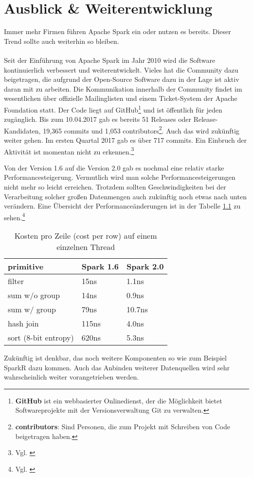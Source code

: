\newpage
\chapter{Ausblick \& Weiterentwicklung} 

Immer mehr Firmen führen Apache Spark ein oder nutzen es bereits. Dieser Trend sollte auch weiterhin so bleiben.
\\ \\
\noindent
Seit der Einführung von Apache Spark im Jahr 2010 wird die Software kontinuierlich verbessert und weiterentwickelt. 
Vieles hat die Community dazu beigetragen, die aufgrund der Open-Source Software dazu in der Lage ist aktiv daran mit zu arbeiten. 
Die Kommunikation innerhalb der Community findet im wesentlichen über offizielle Mailinglisten und einem Ticket-System der Apache Foundation statt.
Der Code liegt auf GitHub\footnote{\textbf{GitHub} ist ein webbasierter Onlinedienst, der die Möglichkeit bietet Softwareprojekte mit der Versionsverwaltung Git zu verwalten.} und ist öffentlich für jeden zugänglich. 
Bis zum 10.04.2017 gab es bereits 51 Releases oder Release-Kandidaten, 19,365 commits und 1,053 contributors\footnote{\textbf{contributors}: Sind Personen, die zum Projekt mit Schreiben von Code beigetragen haben.}.
Auch das wird zukünftig weiter gehen. Im ersten Quartal 2017 gab es über 717 commits. Ein Einbruch der Aktivität ist momentan nicht zu erkennen.\footnote{Vgl. \cite{GITHUB}}


\noindent
Von der Version 1.6 auf die Version 2.0 gab es nochmal eine relativ starke Performancesteigerung. Vermutlich wird man solche Performancesteigerungen nicht mehr so leicht erreichen. Trotzdem sollten Geschwindigkeiten bei der Verarbeitung solcher großen Datenmengen auch zukünftig noch etwas nach unten verändern. Eine Übersicht der Performanceänderungen ist in der Tabelle \ref{tab:spark_2_0} zu sehen.\footnote{Vgl. \cite{DATABRICK_SPARK_2_0}}


\begin{table}[h]
  \centering
		
		  \begin{tabular}[t]{|l|l|l|}
    \hline
		
		\rowcolor[gray]{.9}
		
				primitive	 & Spark 1.6 &  Spark 2.0 \\ \hline				
				filter &	15ns &	1.1ns \\ \hline				
				sum w/o group &	14ns &	0.9ns \\ \hline				
				sum w/ group &	79ns &	10.7ns \\ \hline				
				hash join	& 115ns	& 4.0ns \\ \hline				
				sort (8-bit entropy)	& 620ns	 & 5.3ns \\ \hline				

  \end{tabular}
		
  \caption{Kosten pro Zeile (cost per row) auf einem einzelnen Thread}\label{tab:spark_2_0}
\end{table}



\noindent
Zukünftig ist denkbar, das noch weitere Komponenten so wie zum Beispiel SparkR dazu kommen. Auch das Anbinden weiterer Datenquellen wird sehr wahrscheinlich weiter vorangetrieben werden.